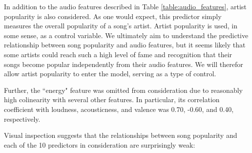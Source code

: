 \documentclass[12pt, twoside]{article}
\begin{document}
In addition to the audio features described in Table \ref{table:audio_features}, artist popularity is also considered. As one would expect, this predictor simply measures the overall popularity of a song's artist. Artist popularity is used, in some sense, as a control variable. We ultimately aim to understand the predictive relationship between song popularity and audio features, but it seems likely that some artists could reach such a high level of fame and recognition that their songs become popular independently from their audio features. We will therefor allow artist popularity to enter the model, serving as a type of control.

Further, the ``energy" feature was omitted from consideration due to reasonably high colinearity with several other features. In particular, its correlation coefficient with loudness, acousticness, and valence was 0.70, -0.60, and 0.40, respectively. 

Visual inspection suggests that the relationships between song popularity and each of the 10 predictors in consideration are surprisingly weak:
\end{document}
